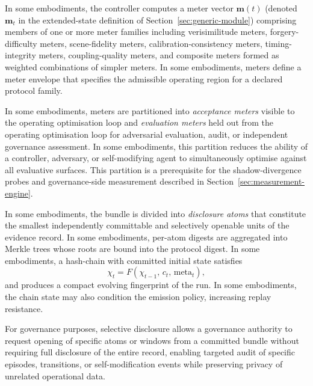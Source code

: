 \documentclass[a4paper,12pt]{article}
\begin{document}
In some embodiments, the controller computes a meter vector $\mathbf{m}(t)$
(denoted $\mathbf{m}_t$ in the extended-state definition of
Section~\ref{sec:generic-module})
comprising members of one or more meter families including
verisimilitude meters, forgery-difficulty meters, scene-fidelity
meters, calibration-consistency meters, timing-integrity meters,
coupling-quality meters, and composite meters formed as weighted
combinations of simpler meters. In some embodiments, meters define a
meter envelope that specifies the admissible operating region for a
declared protocol family.

In some embodiments, meters are partitioned into \emph{acceptance
meters} visible to the operating optimisation loop and
\emph{evaluation meters} held out from the operating optimisation loop
for adversarial evaluation, audit, or independent governance
assessment. In some embodiments, this partition reduces the ability of
a controller, adversary, or self-modifying agent to simultaneously
optimise against all evaluative surfaces. This partition is a prerequisite for
the shadow-divergence probes and governance-side measurement described
in Section~\ref{sec:measurement-engine}.

In some embodiments, the bundle is divided into \emph{disclosure atoms}
that constitute the smallest independently committable and selectively
openable units of the evidence record. In some embodiments, per-atom
digests are aggregated into Merkle trees whose roots are bound into
the protocol digest. In some embodiments, a hash-chain with committed
initial state satisfies
\[
  \chi_t = F(\chi_{t-1},\, c_t,\, \mathrm{meta}_t),
\]
and produces a compact evolving fingerprint of the run. In some
embodiments, the chain state may also condition the emission policy,
increasing replay resistance.

For governance purposes, selective disclosure allows a governance
authority to request opening of specific atoms or windows from a
committed bundle without requiring full disclosure of the entire
record, enabling targeted audit of specific episodes, transitions, or
self-modification events while preserving privacy of unrelated
operational data.
\end{document}
